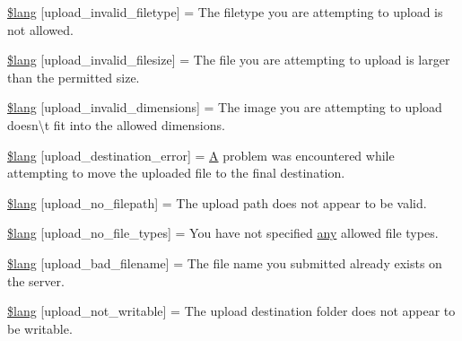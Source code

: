 \begin{DoxyCompactItemize}
\item 
\mbox{\hyperlink{upload__lang_8php_a98bf1d1aac6eb034547936e070ff7e0a}{\$lang}} \mbox{[}\textquotesingle{}upload\+\_\+invalid\+\_\+filetype\textquotesingle{}\mbox{]} = \textquotesingle{}The filetype you are attempting to upload is not allowed.\textquotesingle{}
\item 
\mbox{\hyperlink{upload__lang_8php_a9e27dcfe81917319e2dccfbec17161eb}{\$lang}} \mbox{[}\textquotesingle{}upload\+\_\+invalid\+\_\+filesize\textquotesingle{}\mbox{]} = \textquotesingle{}The file you are attempting to upload is larger than the permitted size.\textquotesingle{}
\item 
\mbox{\hyperlink{upload__lang_8php_a4055120be986694e0ff7d696e26d9395}{\$lang}} \mbox{[}\textquotesingle{}upload\+\_\+invalid\+\_\+dimensions\textquotesingle{}\mbox{]} = \textquotesingle{}The image you are attempting to upload doesn\textbackslash{}\textquotesingle{}t fit into the allowed dimensions.\textquotesingle{}
\item 
\mbox{\hyperlink{upload__lang_8php_ae65b8eeac589242cd57cecdb023f4564}{\$lang}} \mbox{[}\textquotesingle{}upload\+\_\+destination\+\_\+error\textquotesingle{}\mbox{]} = \textquotesingle{}\mbox{\hyperlink{class_a}{A}} problem was encountered while attempting to move the uploaded file to the final destination.\textquotesingle{}
\item 
\mbox{\hyperlink{upload__lang_8php_a8f360e9254fa8e42d23c2261fa613505}{\$lang}} \mbox{[}\textquotesingle{}upload\+\_\+no\+\_\+filepath\textquotesingle{}\mbox{]} = \textquotesingle{}The upload path does not appear to be valid.\textquotesingle{}
\item 
\mbox{\hyperlink{upload__lang_8php_a36a638dbb92bbafa88689e777b5d0a67}{\$lang}} \mbox{[}\textquotesingle{}upload\+\_\+no\+\_\+file\+\_\+types\textquotesingle{}\mbox{]} = \textquotesingle{}You have not specified \mbox{\hyperlink{_functions_8php_aa950afcee01981fe0485ce00ff0e8e8c}{any}} allowed file types.\textquotesingle{}
\item 
\mbox{\hyperlink{upload__lang_8php_a26c58f27f690177bbe6e096348076d0e}{\$lang}} \mbox{[}\textquotesingle{}upload\+\_\+bad\+\_\+filename\textquotesingle{}\mbox{]} = \textquotesingle{}The file name you submitted already exists on the server.\textquotesingle{}
\item 
\mbox{\hyperlink{upload__lang_8php_a3cd474af7c7e6c1d7f28342914cdae40}{\$lang}} \mbox{[}\textquotesingle{}upload\+\_\+not\+\_\+writable\textquotesingle{}\mbox{]} = \textquotesingle{}The upload destination folder does not appear to be writable.\textquotesingle{}
\end{DoxyCompactItemize}


